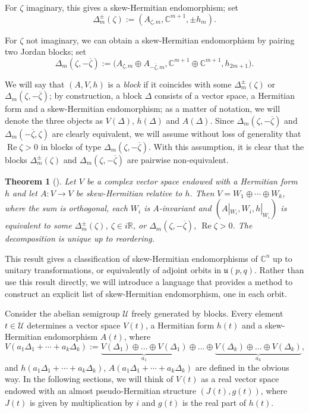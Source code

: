 \documentclass{article}
\newtheorem{theorem}{Theorem}[section]
\theoremstyle{definition}
\newcommand{\R}{\mathbb{R}}
\newcommand{\C}{\mathbb{C}}
\renewcommand{\Re}{\operatorname{Re}}
\newcommand{\lie}[1]{\mathfrak{#1}}
\begin{document}
For $\zeta$ imaginary, this gives a skew-Hermitian endomorphism; set $$\Delta_m^\pm(\zeta):=( A_{\zeta,m},\C^{m+1},\pm h_m).$$

For $\zeta$ not imaginary, we can obtain a skew-Hermitian endomorphism by pairing two Jordan blocks; set $$\Delta_m(\zeta,-\overline\zeta):=\bigl( A_{\zeta,m}\oplus A_{-\overline \zeta,m},\C^{m+1}\oplus\C^{m+1},h_{2m+1}\bigr).$$

We will say that $(A,V,h)$ is a \emph{block} if it coincides with some $\Delta_m^\pm(\zeta)$ or $\Delta_m(\zeta,-\overline\zeta)$; by construction, a block $\Delta$ consists of a vector space, a Hermitian form and a skew-Hermitian endomorphism; as a matter of notation, we will denote the three objects as $V(\Delta)$, $h(\Delta)$ and $A(\Delta)$. Since $\Delta_m(\zeta,-\overline\zeta)$ and $\Delta_m(-\overline\zeta,\zeta)$ are clearly equivalent, we will assume without loss of generality that $\Re\zeta>0$ in blocks of type $\Delta_m(\zeta,-\overline\zeta)$. With this assumption, it is clear that the blocks $\Delta_m^\pm(\zeta)$ and $\Delta_m(\zeta,-\overline\zeta)$ are pairwise non-equivalent.

\begin{theorem}[\cite{Burgoyne_Cushman_1977}]\label{thm:orbits_U(p,q)}
    Let $V$ be a complex vector space endowed with a Hermitian form $h$ and let $A\colon V\to V$ be skew-Hermitian relative to $h$. Then $V=W_1\oplus\cdots\oplus W_k$, where the sum is orthogonal, each $W_i$ is $A$-invariant and $(A|_{W_i},W_i, h|_{W_i})$ is equivalent to some $\Delta_m^\pm(\zeta)$, $\zeta\in i\R$, or $\Delta_m(\zeta,-\overline\zeta)$, $\Re\zeta>0$. The decomposition is unique up to reordering.
\end{theorem}

This result gives a classification of skew-Hermitian endomorphisms of $\C^n$ up to unitary transformations, or equivalently of adjoint orbits in $\lie{u}(p,q)$. Rather than use this result directly, we will introduce a language that provides a method to construct an explicit list of skew-Hermitian endomorphism, one in each orbit.\medskip

Consider the abelian semigroup $\mathcal{U}$ freely generated by blocks. Every element $t\in\mathcal{U}$ determines a vector space $V(t)$, a Hermitian form $h(t)$ and a skew-Hermitian endomorphism $A(t)$, where $$V(a_1\Delta_1+\cdots+a_k\Delta_k):=\underbrace{V(\Delta_1)\oplus \dots \oplus V(\Delta_1)}_{a_1}\oplus \dots \oplus \underbrace{V(\Delta_k)\oplus \dots \oplus V(\Delta_k)}_{a_k},$$ and $h(a_1\Delta_1+\cdots+a_k\Delta_k)$, $A(a_1\Delta_1+\cdots+a_k\Delta_k)$ are defined in the obvious way. In the following sections, we will think of $V(t)$ as a real vector space endowed with an almost pseudo-Hermitian structure $(J(t),g(t))$, where $J(t)$ is given by multiplication by $i$ and $g(t)$ is the real part of $h(t)$.
\end{document}
